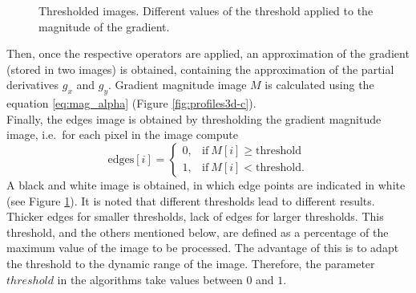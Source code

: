\documentclass{ipol}
\numberwithin{equation}{section}
\numberwithin{table}{section}
\numberwithin{figure}{section}
\begin{document}
\begin{figure}[b!]
	\centering
	\quad
	\quad
	\caption{Thresholded images. Different values of the threshold applied to the magnitude of the gradient.}
	\label{fig:thresholding}
\end{figure}

Then, once the respective operators are applied, an approximation of the gradient (stored in two images) 
is obtained, containing the approximation of the partial derivatives $g_x$ and $g_y$. Gradient magnitude 
image $M$ is calculated using the equation \ref{eq:mag_alpha} (Figure \ref{fig:profiles3d-c}). \\

Finally, the edges image is obtained by thresholding the gradient magnitude image, i.e.\ for each pixel in the image compute
\begin{equation*}
	\mbox{edges}[i] = \begin{cases} 0,& \mbox{if}\ M[i]\geq\mbox{threshold} \\
									1,& \mbox{if}\ M[i]<\mbox{threshold}.
					  \end{cases}
\end{equation*}
A black and white image is obtained, in which edge points are indicated in white (see Figure \ref{fig:thresholding}). 
It is noted that different thresholds lead to different results. Thicker edges for smaller thresholds, lack of edges 
for larger thresholds. This threshold, and the others mentioned below, are defined as a percentage of the maximum value 
of the image to be processed. The advantage of this is to adapt the threshold to the dynamic range of the image. 
Therefore, the parameter $threshold$ in the algorithms take values ​​between $0$ and $1$.
\end{document}
